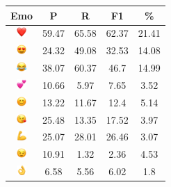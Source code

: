 \documentclass{article}
\begin{document}
\begin{table}
\centering
\begin{tabular}{|c|ccc|c|} \hline
\textbf{Emo} & \textbf{P} & \textbf{R} & \textbf{F1} & \textbf{\%} \\ \hline
\includegraphics[height=0.37cm,width=0.37cm]{img/red_heart.png} & 59.47 & 65.58 & 62.37 & 21.41\\ 
\includegraphics[height=0.37cm,width=0.37cm]{img/smiling_face_with_hearteyes.png} & 24.32 & 49.08 & 32.53 & 14.08\\ 
\includegraphics[height=0.37cm,width=0.37cm]{img/face_with_tears_of_joy.png} & 38.07 & 60.37 & 46.7 & 14.99\\ 
\includegraphics[height=0.37cm,width=0.37cm]{img/two_hearts.png} & 10.66 & 5.97 & 7.65 & 3.52\\ 
\includegraphics[height=0.37cm,width=0.37cm]{img/smiling_face_with_smiling_eyes.png} & 13.22 & 11.67 & 12.4 & 5.14\\ 
\includegraphics[height=0.37cm,width=0.37cm]{img/face_blowing_a_kiss.png} & 25.48 & 13.35 & 17.52 & 3.97\\ 
\includegraphics[height=0.37cm,width=0.37cm]{img/flexed_biceps.png} & 25.07 & 28.01 & 26.46 & 3.07\\ 
\includegraphics[height=0.37cm,width=0.37cm]{img/winking_face.png} & 10.91 & 1.32 & 2.36 & 4.53\\ 
\includegraphics[height=0.37cm,width=0.37cm]{img/OK_hand.png} & 6.58 & 5.56 & 6.02 & 1.8\\ 

\end{tabular}
\end{table}
\end{document}
